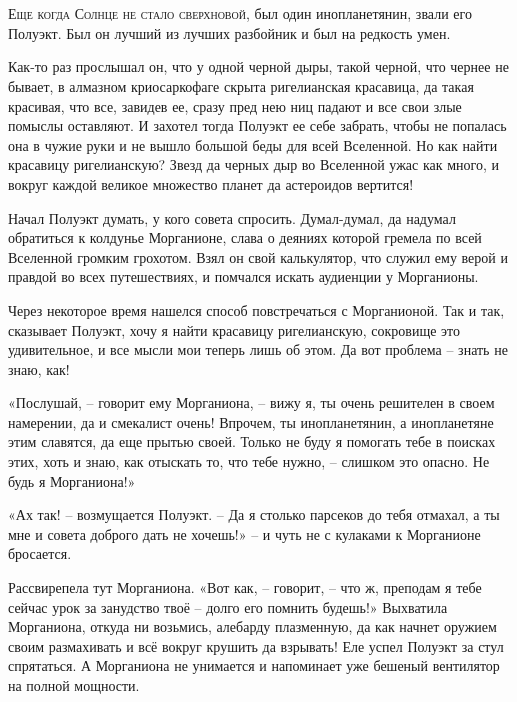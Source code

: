 \documentclass[ebook,oneside,final,openright]{memoir}
\begin{document}
\chapter{}
 \lettrine{Е}{ще когда Солнце не стало сверхновой,} был один инопланетянин, звали его Полуэкт. Был он лучший из лучших разбойник и был на редкость умен.\par
\par
Как-то раз прослышал он, что у одной черной дыры, такой черной, что чернее не бывает, в алмазном криосаркофаге скрыта ригелианская красавица, да такая красивая, что все, завидев ее, сразу пред нею ниц падают и все свои злые помыслы оставляют. И захотел тогда Полуэкт ее себе забрать, чтобы не попалась она в чужие руки и не вышло большой беды для всей Вселенной. Но как найти красавицу ригелианскую? Звезд да черных дыр во Вселенной ужас как много, и вокруг каждой великое множество планет да астероидов вертится!\par
\par
Начал Полуэкт думать, у кого совета спросить. Думал-думал, да надумал обратиться к колдунье Морганионе, слава о деяниях которой гремела по всей Вселенной громким грохотом. Взял он свой калькулятор, что служил ему верой и правдой во всех путешествиях, и помчался искать аудиенции у Морганионы.\par
\par
Через некоторое время нашелся способ повстречаться с Морганионой. Так и так, сказывает Полуэкт, хочу я найти красавицу ригелианскую, сокровище это удивительное, и все мысли мои теперь лишь об этом. Да вот проблема – знать не знаю, как!\par
\par
«Послушай, – говорит ему Морганиона, – вижу я, ты очень решителен в своем намерении, да и смекалист очень! Впрочем, ты инопланетянин, а инопланетяне этим славятся, да еще прытью своей. Только не буду я помогать тебе в поисках этих, хоть и знаю, как отыскать то, что тебе нужно, – слишком это опасно. Не будь я Морганиона!» \par
\par
«Ах так! – возмущается Полуэкт. – Да я столько парсеков до тебя отмахал, а ты мне и совета доброго дать не хочешь!» – и чуть не с кулаками к Морганионе бросается. \par
\par
Рассвирепела тут Морганиона. «Вот как, – говорит, – что ж, преподам я тебе сейчас урок за занудство твоё – долго его помнить будешь!» Выхватила Морганиона, откуда ни возьмись, алебарду плазменную, да как начнет оружием своим размахивать и всё вокруг крушить да взрывать! Еле успел Полуэкт за стул спрятаться. А Морганиона не унимается и напоминает уже бешеный вентилятор на полной мощности. \par
\end{document}

